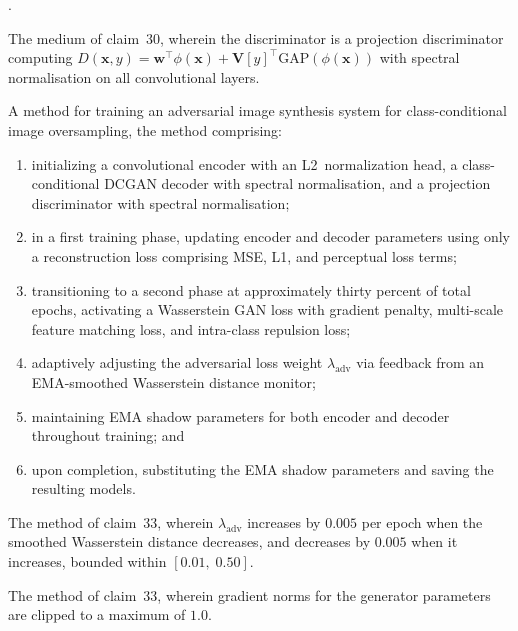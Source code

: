 \documentclass[12pt,letterpaper]{article}
\newcommand{\bx}{\mathbf{x}}
\newcommand{\bw}{\mathbf{w}}
\newcounter{claimnum}
\newenvironment{claims}{%
  \setcounter{claimnum}{0}
  \begin{list}{\arabic{claimnum}.}{%
    \usecounter{claimnum}
    \setlength{\leftmargin}{2em}
    \setlength{\labelsep}{0.5em}
    \setlength{\itemsep}{0pt}
    \setlength{\parsep}{6pt plus 2pt}
  }%
}{\end{list}}
\begin{document}
\begin{claims}
\item The medium of claim~30, wherein the discriminator is a projection
discriminator computing
$D(\bx,y) = \bw^\top\phi(\bx) + \mathbf{V}[y]^\top\text{GAP}(\phi(\bx))$
with spectral normalisation on all convolutional layers.


\item A method for training an adversarial image synthesis system for
class-conditional image oversampling, the method comprising:
\begin{enumerate}[label=(\alph*),leftmargin=1.5em,nosep]
  \item initializing a convolutional encoder with an L2~normalization head,
    a class-conditional DCGAN decoder with spectral normalisation, and a
    projection discriminator with spectral normalisation;
  \item in a first training phase, updating encoder and decoder parameters
    using only a reconstruction loss comprising MSE, L1, and perceptual
    loss terms;
  \item transitioning to a second phase at approximately thirty percent of
    total epochs, activating a Wasserstein GAN loss with gradient penalty,
    multi-scale feature matching loss, and intra-class repulsion loss;
  \item adaptively adjusting the adversarial loss weight
    $\lambda_{\text{adv}}$ via feedback from an EMA-smoothed Wasserstein
    distance monitor;
  \item maintaining EMA shadow parameters for both encoder and decoder
    throughout training; and
  \item upon completion, substituting the EMA shadow parameters and saving
    the resulting models.
\end{enumerate}

\item The method of claim~33, wherein $\lambda_{\text{adv}}$ increases by
$0.005$ per epoch when the smoothed Wasserstein distance decreases, and
decreases by $0.005$ when it increases, bounded within $[0.01,\; 0.50]$.

\item The method of claim~33, wherein gradient norms for the generator
parameters are clipped to a maximum of $1.0$.

\end{claims}

\newpage
\end{document}
